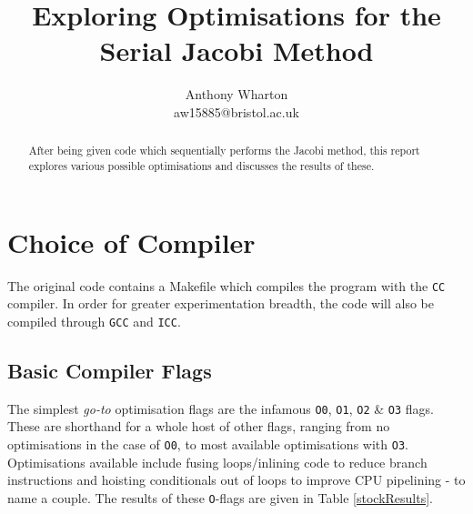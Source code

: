 \documentclass[10pt,twocolumn,a4paper]{article}
\begin{document}
\title{\LARGE\bfseries Exploring Optimisations for the Serial Jacobi Method}
\date{\vspace{-1cm}} %
\author{Anthony Wharton \\ aw15885@bristol.ac.uk}
\maketitle

\begin{abstract}
After being given code which sequentially performs the Jacobi method, this report explores various possible optimisations and discusses the results of these.
\end{abstract}


\section{Choice of Compiler}

The original code\cite{hpc-cw1-code} contains a Makefile which compiles the program with the \texttt{CC} compiler. In order for greater experimentation breadth, the code will also be compiled through \texttt{GCC} and \texttt{ICC}.

\subsection{Basic Compiler Flags}
The simplest \textit{go-to} optimisation flags are the infamous \texttt{O0}, \texttt{O1}, \texttt{O2} \& \texttt{O3} flags. These are shorthand for a whole host of other flags\cite{gcc-docs-optimisations}, ranging from no optimisations in the case of \texttt{O0}, to most available optimisations with \texttt{O3}. Optimisations available include fusing loops/inlining code to reduce branch instructions and hoisting conditionals out of loops to improve CPU pipelining - to name a couple. The results of these \texttt{O}-flags are given in Table \ref{stockResults}.
\end{document}
